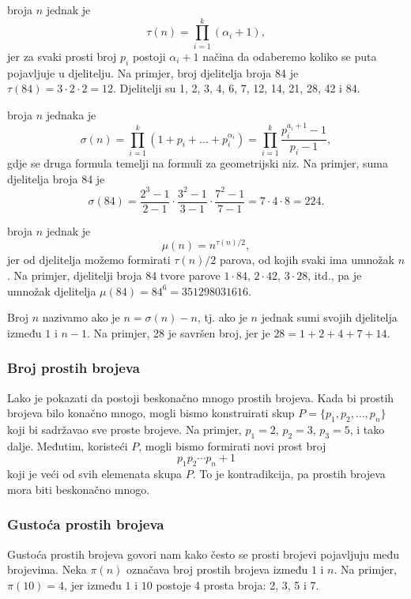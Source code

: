  broja $n$ jednak je
\[\tau(n)=\prod_{i=1}^k (\alpha_i+1),\]
jer za svaki prosti broj $p_i$ postoji
$\alpha_i+1$ načina da odaberemo koliko se puta
pojavljuje u djelitelju.
Na primjer, broj djelitelja
broja 84 je
$\tau(84)=3 \cdot 2 \cdot 2 = 12$.
Djelitelji su
1, 2, 3, 4, 6, 7, 12, 14, 21, 28, 42 i 84.

 broja $n$ jednaka je
\[\sigma(n)=\prod_{i=1}^k (1+p_i+\ldots+p_i^{\alpha_i}) = \prod_{i=1}^k \frac{p_i^{a_i+1}-1}{p_i-1},\]
gdje se druga formula temelji na formuli za geometrijski niz.
Na primjer, suma djelitelja broja 84 je
\[\sigma(84)=\frac{2^3-1}{2-1} \cdot \frac{3^2-1}{3-1} \cdot \frac{7^2-1}{7-1} = 7 \cdot 4 \cdot 8 = 224.\]

 broja $n$ jednak je
\[\mu(n)=n^{\tau(n)/2},\]
jer od djelitelja možemo formirati $\tau(n)/2$ parova,
od kojih svaki ima umnožak $n$.
Na primjer, djelitelji broja 84
tvore parove
$1 \cdot 84$, $2 \cdot 42$, $3 \cdot 28$, itd.,
pa je umnožak djelitelja $\mu(84)=84^6=351298031616$.


Broj $n$ nazivamo  ako je $n=\sigma(n)-n$,
tj. ako je $n$ jednak sumi svojih djelitelja
između $1$ i $n-1$.
Na primjer, 28 je savršen broj,
jer je $28=1+2+4+7+14$.

\subsubsection{Broj prostih brojeva}

Lako je pokazati da postoji beskonačno mnogo
prostih brojeva.
Kada bi prostih brojeva bilo konačno mnogo,
mogli bismo konstruirati skup $P=\{p_1,p_2,\ldots,p_n\}$
koji bi sadržavao sve proste brojeve.
Na primjer, $p_1=2$, $p_2=3$, $p_3=5$, i tako dalje.
Međutim, koristeći $P$, mogli bismo formirati novi prost broj
\[p_1 p_2 \cdots p_n+1\]
koji je veći od svih elemenata skupa $P$.
To je kontradikcija, pa prostih brojeva
mora biti beskonačno mnogo.

\subsubsection{Gustoća prostih brojeva}

Gustoća prostih brojeva govori nam kako često se prosti brojevi
pojavljuju među brojevima.
Neka $\pi(n)$ označava broj prostih brojeva između
$1$ i $n$. Na primjer, $\pi(10)=4$, jer
između $1$ i $10$ postoje 4 prosta broja: 2, 3, 5 i 7.

